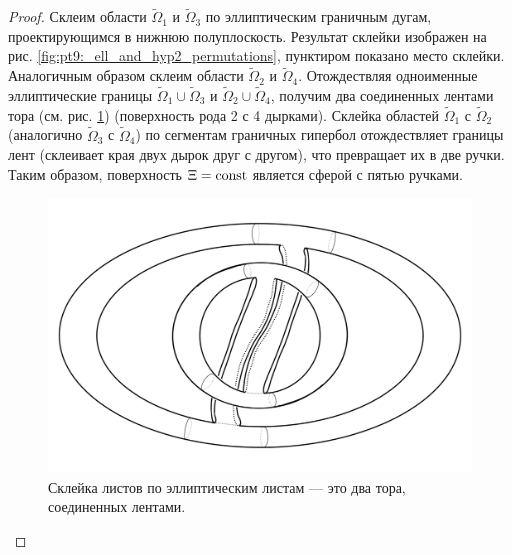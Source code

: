 \begin{proof}
Склеим области $\widetilde{\Omega}_1$ и $\widetilde{\Omega}_3$ по эллиптическим граничным дугам, проектирующимся в нижнюю полуплоскость. Результат склейки изображен на рис. \ref{fig:pt9:_ell_and_hyp2_permutations}, пунктиром показано место склейки.  Аналогичным образом склеим области $\widetilde{\Omega}_2$ и $\widetilde{\Omega}_4$. 
Отождествляя одноименные эллиптические границы  $\widetilde{\Omega}_1 \cup \widetilde{\Omega}_3$ и $\widetilde{\Omega}_2 \cup \widetilde{\Omega}_4$, получим два соединенных лентами тора (см. рис. \ref{fig:pt9:_ell_and_hyp2_transformations}) (поверхность рода 2 с 4 дырками). Склейка областей $\widetilde{\Omega}_1$ с $\widetilde{\Omega}_2$ (аналогично $\widetilde{\Omega}
_3$ с $\widetilde{\Omega}_4$) по сегментам граничных гипербол отождествляет границы лент (склеивает края двух дырок друг с другом), что превращает их в две ручки. Таким образом, поверхность $\Xi=\mathrm{const}$ является сферой с пятью ручками.
\begin{figure}[!ht]
\centering
\includegraphics[scale=0.08]{images/section2/ell_and_hyp2_transformations.pdf}
    \caption{Склейка листов по эллиптическим листам --- это два тора, соединенных лентами.}
    \label{fig:pt9:_ell_and_hyp2_transformations}
\end{figure}
\end{proof}

